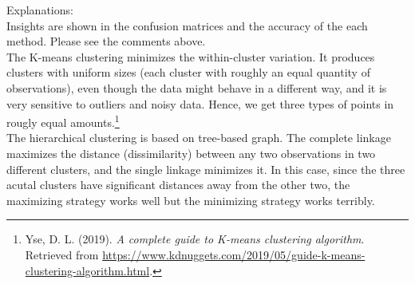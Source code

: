 \documentclass[10pt]{article}
\begin{document}
\begin{enumerate}[1)]
Explanations:\\
Insights are shown in the confusion matrices and the accuracy of the each method. Please see the comments above.\\
The K-means clustering minimizes the within-cluster variation. It produces clusters with uniform sizes (each cluster with roughly an equal quantity of observations), even though the data might behave in a different way, and it is very sensitive to outliers and noisy data. Hence, we get three types of points in rougly equal amounts.\footnote{ Yse, D. L. (2019). \textit{A complete guide to K-means clustering algorithm}. Retrieved from \url{https://www.kdnuggets.com/2019/05/guide-k-means-clustering-algorithm.html}.}\\
The hierarchical clustering is based on tree-based graph. The complete linkage maximizes the distance (dissimilarity) between any
two observations in two different clusters, and the single linkage minimizes it. In this case, since the three acutal clusters have significant distances away from the other two, the maximizing strategy works well but the minimizing strategy works terribly.
\vspace{3mm}


\end{enumerate}
\end{document}
